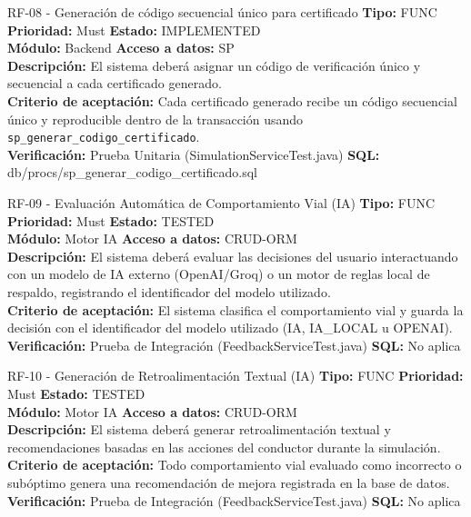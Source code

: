 \documentclass[11pt,a4paper]{article}
\begin{document}
\begin{requisito}{RF-08 - Generación de código secuencial único para certificado}
    \textbf{Tipo:} FUNC \quad \textbf{Prioridad:} Must \quad \textbf{Estado:} IMPLEMENTED \\[0.2cm]
    \textbf{Módulo:} Backend \quad \textbf{Acceso a datos:} SP \\[0.2cm]
    \textbf{Descripción:} El sistema deberá asignar un código de verificación único y secuencial a cada certificado generado. \\[0.2cm]
    \textbf{Criterio de aceptación:} Cada certificado generado recibe un código secuencial único y reproducible dentro de la transacción usando \texttt{sp\_generar\_codigo\_certificado}. \\[0.2cm]
    \textbf{Verificación:} Prueba Unitaria (SimulationServiceTest.java) \quad \textbf{SQL:} db/procs/sp\_generar\_codigo\_certificado.sql
\end{requisito}

\begin{requisito}{RF-09 - Evaluación Automática de Comportamiento Vial (IA)}
    \textbf{Tipo:} FUNC \quad \textbf{Prioridad:} Must \quad \textbf{Estado:} TESTED \\[0.2cm]
    \textbf{Módulo:} Motor IA \quad \textbf{Acceso a datos:} CRUD-ORM \\[0.2cm]
    \textbf{Descripción:} El sistema deberá evaluar las decisiones del usuario interactuando con un modelo de IA externo (OpenAI/Groq) o un motor de reglas local de respaldo, registrando el identificador del modelo utilizado. \\[0.2cm]
    \textbf{Criterio de aceptación:} El sistema clasifica el comportamiento vial y guarda la decisión con el identificador del modelo utilizado (IA, IA\_LOCAL u OPENAI). \\[0.2cm]
    \textbf{Verificación:} Prueba de Integración (FeedbackServiceTest.java) \quad \textbf{SQL:} No aplica
\end{requisito}

\begin{requisito}{RF-10 - Generación de Retroalimentación Textual (IA)}
    \textbf{Tipo:} FUNC \quad \textbf{Prioridad:} Must \quad \textbf{Estado:} TESTED \\[0.2cm]
    \textbf{Módulo:} Motor IA \quad \textbf{Acceso a datos:} CRUD-ORM \\[0.2cm]
    \textbf{Descripción:} El sistema deberá generar retroalimentación textual y recomendaciones basadas en las acciones del conductor durante la simulación. \\[0.2cm]
    \textbf{Criterio de aceptación:} Todo comportamiento vial evaluado como incorrecto o subóptimo genera una recomendación de mejora registrada en la base de datos. \\[0.2cm]
    \textbf{Verificación:} Prueba de Integración (FeedbackServiceTest.java) \quad \textbf{SQL:} No aplica
\end{requisito}
\end{document}
